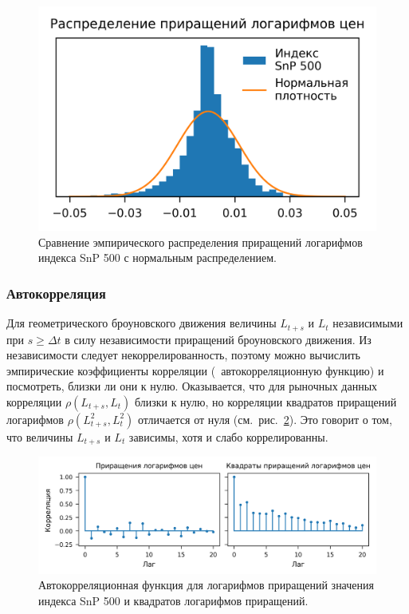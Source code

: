 \begin{figure}[t]
\includegraphics{pic/snp-hist.png}
\centering
\caption{Сравнение эмпирического распределения приращений логарифмов индекса SnP 500 с нормальным распределением.}
\label{intro:f:hist}
\end{figure}


\subsubsection{Автокорреляция}

Для геометрического броуновского движения величины $L_{t+s}$ и $L_t$ независимыми при $s\ge \Delta t$ в силу независимости приращений броуновского движения.
Из независимости следует некоррелированность, поэтому можно вычислить эмпирические коэффициенты корреляции (\te\ автокорреляционную функцию) и посмотреть, близки ли они к нулю.
Оказывается, что для рыночных данных корреляции $\rho(L_{t+s},L_t)$ близки к нулю, но корреляции квадратов приращений логарифмов $\rho(L_{t+s}^2,L_t^2)$ отличается от нуля (см.~рис.~\ref{intro:f:autocorr}).
Это говорит о том, что величины $L_{t+s}$ и $L_t$ зависимы, хотя и слабо коррелированны. 

\begin{figure}[t]
\includegraphics{pic/snp-autocorr.png}
\centering
\caption{Автокорреляционная функция для логарифмов приращений значения индекса SnP 500 и квадратов логарифмов приращений.}
\label{intro:f:autocorr}
\end{figure}


